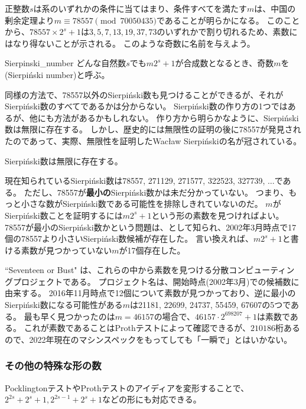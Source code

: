 正整数$s$は系のいずれかの条件に当てはまり、条件すべてを満たす$m$は、中国の剰余定理より$m\equiv78557\pmod{70050435}$であることが明らかになる。
このことから、$78557\times 2^s+1$は$3, 5, 7, 13, 19, 37, 73$のいずれかで割り切れるため、素数にはなり得ないことが示される。
このような奇数に名前を与えよう。

\begin{Defi}{}{Sierpinski_number}
どんな自然数$s$でも$m2^s+1$が合成数となるとき、奇数$m$を(Sierpiński number)と呼ぶ。
\end{Defi}

同様の方法で、78557以外のSierpiński数も見つけることができるが、それがSierpiński数のすべてであるかは分からない。
Sierpiński数の作り方の1つではあるが、他にも方法があるかもしれない。
作り方から明らかなように、Sierpiński数は無限に存在する。
しかし、歴史的には無限性の証明の後に78557が発見されたのであって、実際、無限性を証明したWacław Sierpińskiの名が冠されている。

\begin{Theo}{\cite{Sierpinski1960}}{}
Sierpiński数は無限に存在する。
\end{Theo}

現在知られているSierpiński数は78557, 271129, 271577, 322523, 327739, $\ldots$である。
ただし、78557が\textbf{最小の}Sierpiński数かは未だ分かっていない。
つまり、もっと小さな数がSierpiński数である可能性を排除しきれていないのだ。
$m$がSierpiński数ことを証明するには$m2^s+1$という形の素数を見つければよい。
78557が最小のSierpiński数かという問題は、として知られ、2002年3月時点で17個の78557より小さいSierpiński数候補が存在した。
言い換えれば、$m2^s+1$と書ける素数が見つかっていない$m$が17個存在した。

``Seventeen or Bust" は、これらの中から素数を見つける分散コンピューティングプロジェクトである。
プロジェクト名は、開始時点(2002年3月)での候補数に由来する。
2016年11月時点で12個について素数が見つかっており、逆に最小のSierpiński数になる可能性がある$m$は21181, 22699, 24737, 55459, 67607の5つである。
最も早く見つかったのは$m=46157$の場合で、$46157\cdot2^{698207}+1$は素数である。
これが素数であることはProthテストによって確認できるが、$210186$桁あるので、2022年現在のマシンスペックをもってしても「一瞬で」とはいかない。

\subsubsection{その他の特殊な形の数}
PocklingtonテストやProthテストのアイディアを変形することで、$2^{2s}+2^s+1, 2^{2s-1}+2^s+1$などの形にも対応できる。

